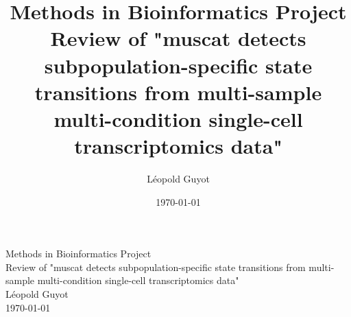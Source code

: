 \documentclass[a4paper, 11pt, twocolumn]{article}
\title{\Large Methods in Bioinformatics Project \\
\huge Review of "muscat detects subpopulation-specific state transitions from multi-sample multi-condition single-cell transcriptomics data"}
\author{Léopold Guyot}
\date{\today}
\begin{document}
\pagestyle{fancy}
\setlength{\headheight}{25.0117pt}
\fancyhead{}\fancyfoot{}
\fancyfoot[R]{\thepage}



\onecolumn
\vspace*{-1.5cm}  %
\begin{center}
	{\Large Methods in Bioinformatics Project}\\[1ex]
	{\huge Review of "muscat detects subpopulation-specific state transitions from multi-sample multi-condition single-cell transcriptomics data" \cite{crowell2020muscat}}\\[2ex]
	{\large Léopold Guyot}\\[1ex]
	{\today}
\end{center}
 
\thispagestyle{plainfooter}



\end{document}

